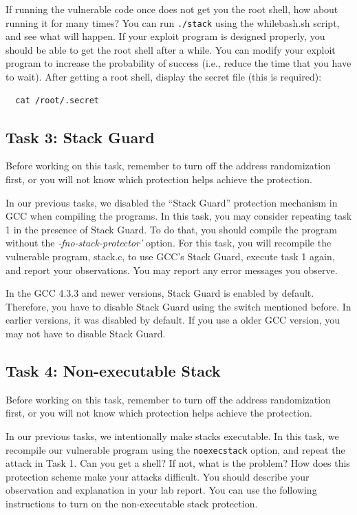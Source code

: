 If running the vulnerable code once does not get you the root shell, how 
about running it for many times? You can run {\tt ./stack} 
using the whilebash.sh script, and see what will happen. If your exploit
program is designed properly, you should be able to get the root shell
after a while. You can modify your exploit program to increase the
probability of success (i.e., reduce the time that you have to wait).
After getting a root shell, display the secret file (this is required):
\begin{verbatim}
  cat /root/.secret
\end{verbatim}

\subsection{Task 3: Stack Guard}

Before working on this task, remember to turn off the address
randomization first, or you will not know which protection helps 
achieve the protection.

In our previous tasks, we disabled the ``Stack Guard'' protection mechanism in GCC
when compiling the programs. In this task, you may consider repeating
task 1 in the presence of Stack Guard. To do that, you should compile
the program without the \emph{-fno-stack-protector'} option. For this
task, you will recompile the vulnerable program, stack.c, to use GCC's
Stack Guard, execute task 1 again, and report your observations. You
may report any error messages you observe.

In the GCC 4.3.3 and newer versions, Stack Guard is enabled by
default. Therefore, you have to disable Stack Guard using the switch
mentioned before. In earlier versions, it was disabled by default. If
you use a older GCC version, you may not have to disable Stack Guard. 

\subsection{Task 4: Non-executable Stack}

Before working on this task, remember to turn off the address
randomization first, or you will not know which protection helps 
achieve the protection.

In our previous tasks, we intentionally make stacks executable.
In this task, we recompile our vulnerable program 
using the {\tt noexecstack} option, and repeat the attack in
Task 1. Can you get a shell? If not, what is the problem? How does
this protection scheme make your attacks difficult. 
You should describe your observation and explanation
in your lab report. You can use the following instructions to turn
on the non-executable stack protection.

